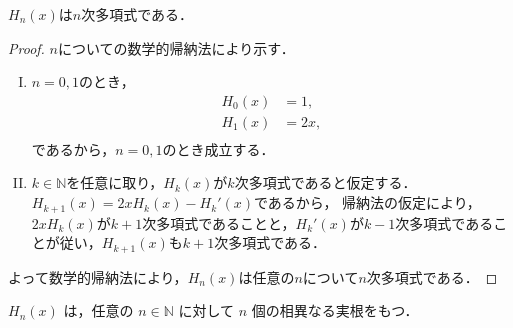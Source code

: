 \documentclass[a4paper,10pt,fleqn]{ltjsarticle}
\begin{document}

$H_n (x)$は$n$次多項式である．

\begin{leftbar}
    \begin{proof}
        $n$についての数学的帰納法により示す．
        \begin{enumerate}[(I)]
            \item $n =0, 1$のとき，
                  \begin{align*}
                      H_0 (x) & = 1,  \\
                      H_1 (x) & = 2x, \\
                  \end{align*}
                  であるから，$n=0, 1 $のとき成立する．
            \item $k \in \mathbb{N}$を任意に取り，$H_k (x)$が$k$次多項式であると仮定する．
                  $ H_{k+1}(x) =  2x H_k(x)-H_k'(x)$であるから，
                  帰納法の仮定により，$ 2 x H_k (x)$が$k+1$次多項式であることと，$H_k'(x)$が$k-1$次多項式であることが従い，$H_{k+1}(x)$も$k+1$次多項式である．
        \end{enumerate}
        よって数学的帰納法により，$H_n (x)$は任意の$n$について$n$次多項式である．
    \end{proof}
\end{leftbar}


$H_n(x)$ は，任意の $n \in \mathbb{N}$ に対して $n$ 個の相異なる実根をもつ．
\end{document}
